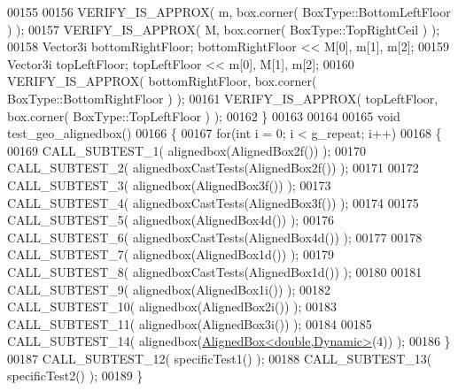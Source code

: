 \begin{DoxyCode}
00155 
00156     VERIFY\_IS\_APPROX( m, box.corner( BoxType::BottomLeftFloor ) );
00157     VERIFY\_IS\_APPROX( M, box.corner( BoxType::TopRightCeil ) );
00158     Vector3i bottomRightFloor; bottomRightFloor << M[0], m[1], m[2];
00159     Vector3i topLeftFloor; topLeftFloor << m[0], M[1], m[2];
00160     VERIFY\_IS\_APPROX( bottomRightFloor, box.corner( BoxType::BottomRightFloor ) );
00161     VERIFY\_IS\_APPROX( topLeftFloor, box.corner( BoxType::TopLeftFloor ) );
00162 \}
00163 
00164 
00165 \textcolor{keywordtype}{void} test\_geo\_alignedbox()
00166 \{
00167   \textcolor{keywordflow}{for}(\textcolor{keywordtype}{int} i = 0; i < g\_repeat; i++)
00168   \{
00169     CALL\_SUBTEST\_1( alignedbox(AlignedBox2f()) );
00170     CALL\_SUBTEST\_2( alignedboxCastTests(AlignedBox2f()) );
00171 
00172     CALL\_SUBTEST\_3( alignedbox(AlignedBox3f()) );
00173     CALL\_SUBTEST\_4( alignedboxCastTests(AlignedBox3f()) );
00174 
00175     CALL\_SUBTEST\_5( alignedbox(AlignedBox4d()) );
00176     CALL\_SUBTEST\_6( alignedboxCastTests(AlignedBox4d()) );
00177 
00178     CALL\_SUBTEST\_7( alignedbox(AlignedBox1d()) );
00179     CALL\_SUBTEST\_8( alignedboxCastTests(AlignedBox1d()) );
00180 
00181     CALL\_SUBTEST\_9( alignedbox(AlignedBox1i()) );
00182     CALL\_SUBTEST\_10( alignedbox(AlignedBox2i()) );
00183     CALL\_SUBTEST\_11( alignedbox(AlignedBox3i()) );
00184 
00185     CALL\_SUBTEST\_14( alignedbox(\hyperlink{group___geometry___module_class_eigen_1_1_aligned_box}{AlignedBox<double,Dynamic>}(4)) );
00186   \}
00187   CALL\_SUBTEST\_12( specificTest1() );
00188   CALL\_SUBTEST\_13( specificTest2() );
00189 \}
\end{DoxyCode}
